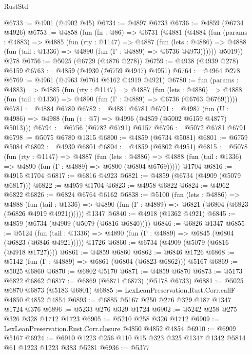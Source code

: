 \begin{lexlean}{RustStd}
\begin{coremodule}
@6733 := @4901 (@4902 @45)
@6734 := @4897 @6733
@6736 := @4859 (@6734 @4926)
@6753 := @4858
    (fun (fn : @86) =>
    @6731
      (@4881
        (@4884
          (fun (params : @4883) =>
          @4885
            (fun (rty : @1147) =>
            @4887
              (fun (lets : @4886) =>
              @4888 (fun (tail : @1336) => @4890 (fun (Γ : @4889) => @6736 @4973))))))
        @5019))
    @278
@6756 := @5025 (@6729 (@4876 @278))
@6759 := @4938 (@4939 @278) @6159
@6763 := @4859 (@4930 (@6759 @4947) @4951)
@6764 := @4964 @278
@6769 := @4961 (@4963 @6764 @6162 @4919 @4921)
@6780 := fun (params : @4883) =>
  @4885
    (fun (rty : @1147) =>
    @4887
      (fun (lets : @4886) =>
      @4888 (fun (tail : @1336) => @4890 (fun (Γ : @4889) => @6736 (@6763 @6769)))))
@6781 := @4884 @6780
@6782 := @4881 @6781
@6791 := @4987 (fun (U : @4986) => @4988 (fun (t : @7) => @4996 (@4859 (@5002 @6159 @4877) @5013)))
@6794 := @6756 (@6782 @6791) @6157
@6796 := @5072 @6781 @6791
@6798 := @5075 @6780 @1315
@6800 := @4859 (@6734 @5081)
@6801 := @6759 @5084
@6802 := @4930 @6801
@6804 := @4859 (@6802 @4951)
@6815 := @5078
    (fun (rty : @1147) =>
    @4887
      (fun (lets : @4886) =>
      @4888 (fun (tail : @1336) => @4890 (fun (Γ : @4889) => @6800 (@6804 @6769)))))
    @1704
@6816 := @4915 @1704
@6817 := @6816 @4923
@6821 := @4859 (@6734 (@4909 (@5079 @6817)))
@6822 := @4959 @1704
@6823 := @4958 @6822
@6824 := @4962 @6822
@6826 := @6824 @6764 @6162
@6838 := @5100
    (fun (lets : @4886) =>
    @4888
      (fun (tail : @1336) => @4890 (fun (Γ : @4889) => @6821 (@6804 (@6823 (@6826 @4919 @4921))))))
    @1347
@6840 := @4918 (@1362 @4921)
@6845 := @4859 (@6734 (@4909 (@5079 (@6816 @6840))))
@6846 := @6826 @1347
@6855 := @5124
    (fun (tail : @1336) => @4890 (fun (Γ : @4889) => @6845 (@6804 (@6823 (@6846 @4921)))))
    @1726
@6860 := @6734 (@4909 (@5079 (@6816 (@4918 @1727))))
@6861 := @4859 @6860
@6862 := @6846 @1726
@6868 := @5142 (fun (Γ : @4889) => @6861 (@6804 (@6823 @6862))) @5167
@6869 := @5025 @6860
@6870 := @6802 @5170
@6871 := @4859 @6870
@6873 := @5173 @6822 @6862
@6877 := @6869 (@6871 @6873) (@5178 @6733)
@6881 := @5025 @6870 @6873 (@5183 @6801)
@6885 := LexLeanPreservation.Rust.Corr.callF @4850 @4852 @4854
@6893 := @6885 @5167 @250 @276 @329 @187 @1347 @1724 @376
@6896 := @5233 @276 @329 @1724
@6902 := @5242 @258 @275 @326 @328 @1712 @1723
@6905 := @5210 @258 @326 @1712
@6909 := LexLeanPreservation.Rust.Corr.closure @4850 @4852 @4854
@6910 := @6909 @5167
@6924 := @6910 @1223 @256 @110 @15 @323 @325 @1347 @1342 @5814 @61 @1223 @1223 @383 @5281
@6936 := @5377

\end{coremodule}
\end{lexlean}
